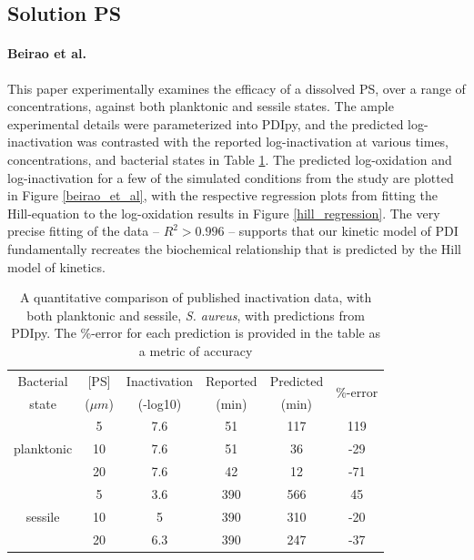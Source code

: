 \subsection{Solution PS}

\paragraph{Beirao et al.\cite{Beirao2014PhotodynamicPorphyrin}}
This paper experimentally examines the efficacy of a dissolved PS, over a range of concentrations, against both planktonic and sessile states. The ample experimental details were parameterized into PDIpy, and the predicted log-inactivation was contrasted with the reported log-inactivation at various times, concentrations, and bacterial states in Table \ref{beirao_et_al_data}. The predicted log-oxidation and log-inactivation for a few of the simulated conditions from the study are plotted in Figure \ref{beirao_et_al}, with the respective regression plots from fitting the Hill-equation to the log-oxidation results in Figure \ref{hill_regression}. The very precise fitting of the data -- $R^2 > 0.996$ -- supports that our kinetic model of PDI fundamentally recreates the biochemical relationship that is predicted by the Hill model of kinetics.

\begin{table}[h]
    \centering
    \begin{tabular}{c|c|c|c|c|c}
        Bacterial & [PS] & Inactivation & Reported & Predicted & \multirow{2}{1.2cm}{\%-error}\\
        state & ($\mu m$) & (-log10) & (min) & (min) & \\
        \toprule
        \multirow{3}{1.5cm}{planktonic} & 5 & 7.6 & 51 & 117 & 119\\
        & 10 & 7.6 & 51 & 36 & -29\\
        & 20 & 7.6 & 42 & 12 & -71\\
        \midrule
        \multirow{3}{1.5cm}{sessile} & 5 & 3.6 & 390 & 566 & 45\\
        & 10 & 5 & 390 & 310 & -20\\
        & 20 & 6.3 & 390 & 247 & -37\\
        \bottomrule
    \end{tabular}
    \caption{
        A quantitative comparison of published inactivation data, with both planktonic and sessile, \textit{S. aureus}, with predictions from PDIpy. The \%-error for each prediction is provided in the table as a metric of accuracy
    }
    \label{beirao_et_al_data}
\end{table}

